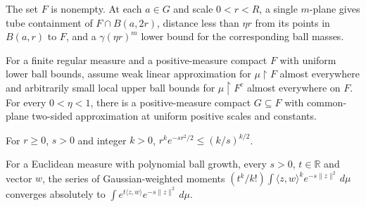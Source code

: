 \begin{definition}
\label{def:two-sided-approximation}

The set $F$ is nonempty. At each $a\in G$ and scale $0<r<R$, a single $m$-plane gives tube containment of $F\cap B(a,2r)$, distance less than $\eta r$ from its points in $B(a,r)$ to $F$, and a $\gamma(\eta r)^m$ lower bound for the corresponding ball masses.
\end{definition}

\begin{lemma}
\label{lem:compact-two-sided-general}

For a finite regular measure and a positive-measure compact $F$ with uniform lower ball bounds, assume weak linear approximation for $\mu\restriction F$ almost everywhere and arbitrarily small local upper ball bounds for $\mu\restriction F^c$ almost everywhere on $F$. For every $0<\eta<1$, there is a positive-measure compact $G\subseteq F$ with common-plane two-sided approximation at uniform positive scales and constants.
\end{lemma}

\begin{lemma}
\label{lem:gaussian-power-envelope}

For $r\geq0$, $s>0$ and integer $k>0$, $r^k e^{-sr^2/2}\leq(k/s)^{k/2}$.
\end{lemma}

\begin{lemma}
\label{lem:integrated-gaussian-exponential-series}

For a Euclidean measure with polynomial ball growth, every $s>0$, $t\in\mathbb R$ and vector $w$, the series of Gaussian-weighted moments $(t^k/k!)\int\langle z,w\rangle^k e^{-s\lVert z\rVert^2}\,d\mu$ converges absolutely to $\int e^{t\langle z,w\rangle}e^{-s\lVert z\rVert^2}\,d\mu$.
\end{lemma}


